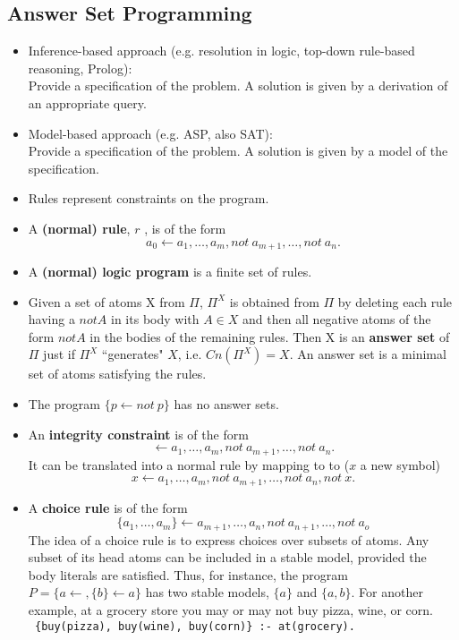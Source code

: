 \documentclass{article}
\begin{document}
\subsection{Answer Set Programming}
\begin{itemize}
\item Inference-based approach (e.g. resolution in logic, top-down rule-based reasoning, Prolog):\\
Provide a specification of the problem. A solution is given by a derivation of an appropriate query.

\item Model-based approach (e.g. ASP, also SAT):\\
Provide a specification of the problem. A solution is given by a model of the specification.

\item Rules represent constraints on the program.

\item A \textbf{(normal) rule}, $r$ , is of the form \[a_0\leftarrow a_1,\ldots,a_m, not \ a_{m+1}, \ldots, not \ a_n. \]
\item A \textbf{(normal) logic program} is a finite set of rules.

\item Given a set of atoms X from $\Pi$, $\Pi^X$ is obtained from $\Pi$ by deleting each rule having a $not A$ in its body with $A \in X$
and then all negative atoms of the form $not A$ in the bodies of the remaining rules. Then X is an \textbf{answer set} of $\Pi$ just if $\Pi^X$ ``generates" $X$, i.e.  $Cn(\Pi^X)= X$. An answer set is a minimal set of atoms satisfying the rules.\\

\item The program $\{p \leftarrow not \ p \}$ has no answer sets.
\item An \textbf{integrity constraint} is of the form \[\leftarrow a_1,\ldots,a_m, not \ a_{m+1}, \ldots, not \ a_n.\]
It can be translated into a normal rule by mapping to to ($x$ a new symbol) \[x\leftarrow a_1,\ldots,a_m, not \ a_{m+1}, \ldots, not \ a_n, not \ x.\]

\item A \textbf{choice rule} is of the form \[\{a_1,\ldots,a_m\}\leftarrow a_{m+1},\ldots,a_n, not \ a_{n+1}, \ldots, not \ a_o \]
The idea of a choice rule is to express choices over subsets of atoms. Any subset of its head
atoms can be included in a stable model, provided the body literals are satisfied. Thus, for instance,
the program $P = \{ a \leftarrow, \{b\} \leftarrow a\}$ has two stable models, $\{a\}$ and $\{a, b\}$. For another example, at
a grocery store you may or may not buy pizza, wine, or corn.\\
\texttt{ \{buy(pizza), buy(wine), buy(corn)\} :- at(grocery).}


\end{itemize}
\end{document}
